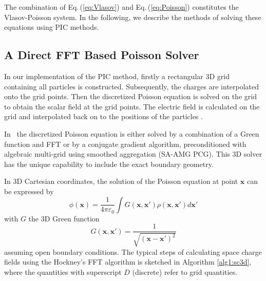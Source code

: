 \documentclass[acus]{JAC2003}
\newcommand{\bs}[1]{\mathbf #1}
\begin{document}
The combination of Eq.\,(\ref{eq:Vlasov}) and Eq.\,(\ref{eq:Poisson}) constitutes the Vlasov-Poisson system. 
In the following, we describe the methods of solving these equations using PIC methods.
\subsection{A Direct FFT Based Poisson Solver}
In our implementation of the PIC method, firstly a rectangular 3D grid containing all particles is constructed.  Subsequently, the charges 
are interpolated onto the grid points. Then the discretized Poisson equation is solved on the grid to obtain the scalar field at the grid points. 
The electric field is calculated on the grid and interpolated back on to the positions of the particles .

In \opal\ the discretized Poisson equation is either solved by a combination of a Green function and FFT or by a conjugate gradient algorithm, preconditioned
with algebraic multi-grid using smoothed aggregation (SA-AMG PCG). This 3D solver has the unique capability to include the exact
boundary geometry. %

In 3D Cartesian coordinates, the solution of the Poisson equation at point $\bs{x}$ can be expressed by 
\begin{equation}\label{eq:Poten}
  \phi(\bs{x})= \frac{1}{4\pi\varepsilon_0}\int{G(\bs{x},\bs{x}')\rho(\bs{x},\bs{x}')d\bs{x}'}
\end{equation}
with $G$ the 3D Green function 
\begin{equation}\label{eq:Green}
  G(\bs{x},\bs{x}')= \frac{1}{\sqrt{(\bs{x}-\bs{x}')^2}}
\end{equation}
assuming open boundary conditions.
The typical steps of calculating space charge fields using the Hockney's FFT algorithm is sketched in Algorithm \ref{alg1:sc3d},
where the quantities with superscript $D$ (discrete) refer to grid quantities.
\end{document}
